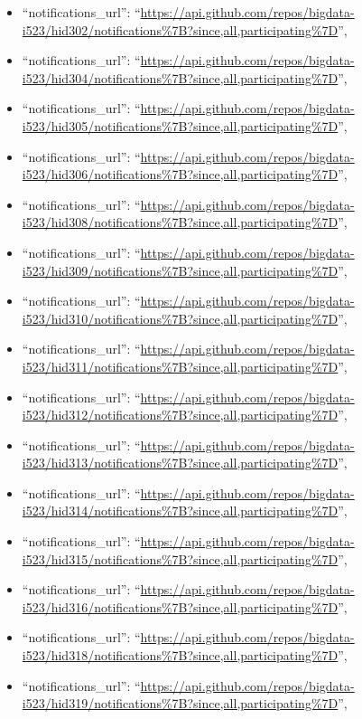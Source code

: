 \begin{itemize}
\item
  ``notifications\_url'':
  ``\url{https://api.github.com/repos/bigdata-i523/hid302/notifications\%7B?since,all,participating\%7D}'',
\item
  ``notifications\_url'':
  ``\url{https://api.github.com/repos/bigdata-i523/hid304/notifications\%7B?since,all,participating\%7D}'',
\item
  ``notifications\_url'':
  ``\url{https://api.github.com/repos/bigdata-i523/hid305/notifications\%7B?since,all,participating\%7D}'',
\item
  ``notifications\_url'':
  ``\url{https://api.github.com/repos/bigdata-i523/hid306/notifications\%7B?since,all,participating\%7D}'',
\item
  ``notifications\_url'':
  ``\url{https://api.github.com/repos/bigdata-i523/hid308/notifications\%7B?since,all,participating\%7D}'',
\item
  ``notifications\_url'':
  ``\url{https://api.github.com/repos/bigdata-i523/hid309/notifications\%7B?since,all,participating\%7D}'',
\item
  ``notifications\_url'':
  ``\url{https://api.github.com/repos/bigdata-i523/hid310/notifications\%7B?since,all,participating\%7D}'',
\item
  ``notifications\_url'':
  ``\url{https://api.github.com/repos/bigdata-i523/hid311/notifications\%7B?since,all,participating\%7D}'',
\item
  ``notifications\_url'':
  ``\url{https://api.github.com/repos/bigdata-i523/hid312/notifications\%7B?since,all,participating\%7D}'',
\item
  ``notifications\_url'':
  ``\url{https://api.github.com/repos/bigdata-i523/hid313/notifications\%7B?since,all,participating\%7D}'',
\item
  ``notifications\_url'':
  ``\url{https://api.github.com/repos/bigdata-i523/hid314/notifications\%7B?since,all,participating\%7D}'',
\item
  ``notifications\_url'':
  ``\url{https://api.github.com/repos/bigdata-i523/hid315/notifications\%7B?since,all,participating\%7D}'',
\item
  ``notifications\_url'':
  ``\url{https://api.github.com/repos/bigdata-i523/hid316/notifications\%7B?since,all,participating\%7D}'',
\item
  ``notifications\_url'':
  ``\url{https://api.github.com/repos/bigdata-i523/hid318/notifications\%7B?since,all,participating\%7D}'',
\item
  ``notifications\_url'':
  ``\url{https://api.github.com/repos/bigdata-i523/hid319/notifications\%7B?since,all,participating\%7D}'',

\end{itemize}
